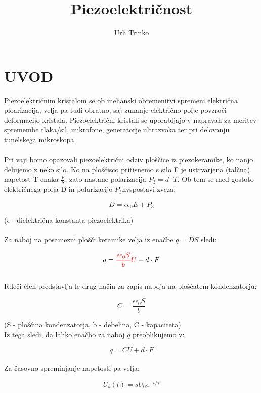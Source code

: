 \documentclass[12pt,a4paper]{article}
\begin{document}
\title{Piezoelektri\v cnost}
\author{Urh Trinko}
\maketitle

\newpage


\section{UVOD}

Piezoelektričnim kristalom se ob mehanski obremenitvi spremeni električna ploarizacija, velja pa tudi obratno, saj zunanje električno polje povzroči deformacijo kristala. Piezoelektrični kristali se uporabljajo v napravah za meritev spremembe tlaka/sil, mikrofone, generatorje ultrazvoka ter pri delovanju tunelskega mikroskopa.
\\
\\
Pri vaji bomo opazovali piezoelektri\v cni odziv ploščice iz piezokeramike, ko nanjo delujemo z neko silo. Ko na ploščisco pritisnemo s silo F je ustrvarjena (talčna) napetost T enaka $\frac{F}{S}$, zato nastane polarizacija $P_{3} = d \cdot T$. Ob tem se med gostoto električnega polja D in polarizacijo $P_3$nvspostavi zveza:

$$D = \epsilon \epsilon_0 E + P_3$$

($\epsilon$ - dielektrična konstanta piezoelektrika)
\\
\\
Za naboj na posamezni plošči keramike velja iz ena\v cbe $q = D S$ sledi:

$$q = \textcolor{red}{\frac{\epsilon \epsilon_0 S}{b} U} + d \cdot F$$
\\
Rdeči člen predstavlja le drug način za zapis naboja na ploščatem kondenzatorju:

\begin{equation}
	{C = \frac{\epsilon \epsilon_0 S}{b}}
\end{equation}

(S - ploščina kondenzatorja, b - debelina, C - kapaciteta)
\\
Iz tega sledi, da lahko enačbo za naboj $q$ preoblikujemo v:

\begin{equation}
	{q = C U + d \cdot F}
\end{equation}
\\
Za časovno spreminjanje napetosti pa velja:

\begin{equation}
	{U_{s}(t) = s U_{0} e^{-t/\tau}}
\end{equation}
\end{document}
